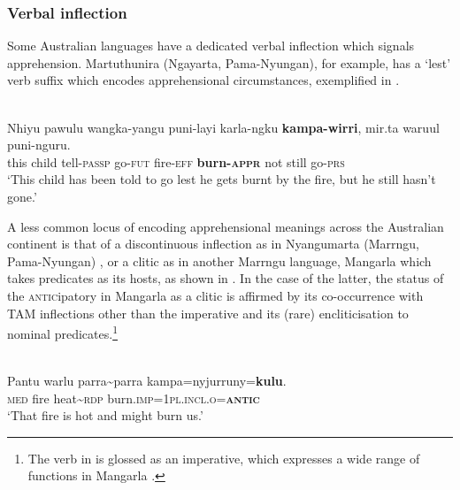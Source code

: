 \documentclass[output=paper,colorlinks,citecolor=brown]{langscibook}
\begin{document}
\subsubsection{Verbal inflection}

Some Australian languages have a dedicated verbal inflection which signals apprehension. Martuthunira (Ngayarta, Pama-Nyungan), for example, has a `lest' verb suffix which encodes apprehensional circumstances, exemplified in .

\ea
{} \\
\gll Nhiyu pawulu wangka-yangu puni-layi karla-ngku \textbf{kampa-wirri}, mir.ta waruul puni-nguru. \\
this child tell-\textsc{passp} go-\textsc{fut} fire-\textsc{eff} \textbf{burn-\textsc{appr}} not still go-\textsc{prs}\\
\glt `This child has been told to go lest he gets burnt by the fire, but he still hasn't gone.'
\label{ex:bro7}
\z

A less common locus of encoding apprehensional meanings across the Australian continent is that of a discontinuous inflection as in Nyangumarta (Marrngu, Pama-Nyungan) \citep[165, 186--187]{sharp_nyangumarta_2004}, or a clitic as in another Marrngu language, Mangarla \citep[335]{agnew_core_2020} which takes predicates as its hosts, as shown in . In the case of the latter, the status of the \textsc{antic}ipatory in Mangarla as a clitic is affirmed by its co-occurrence with TAM inflections other than the imperative and its (rare) encliticisation to nominal predicates.\footnote{The verb in  is glossed as an imperative, which expresses a wide range of functions in Mangarla \citep[320]{agnew_core_2020}.}

\ea
{} \\
\gll Pantu warlu parra\textasciitilde parra kampa=nyjurruny=\textbf{kulu}. \\
\textsc{med} fire heat\textasciitilde \textsc{rdp} burn.\textsc{imp}=\textsc{1pl.incl.o=\textbf{antic}} \\
\glt `That fire is hot and might burn us.'
\label{ex:bro8}
\z
\end{document}
